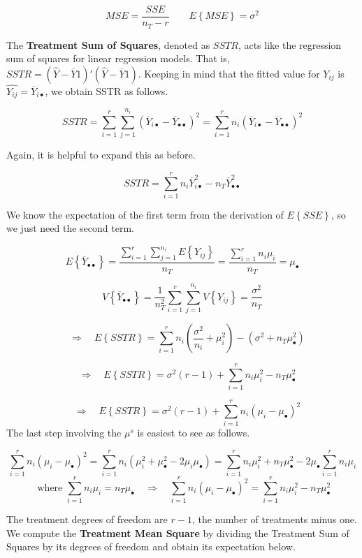\documentclass[
]{book}
\begin{document}
\[
MSE = \frac{SSE}{n_T-r}  \qquad E\left\{MSE\right\} = \sigma^2
\]

The \textbf{Treatment Sum of Squares}, denoted as \(SSTR\), acts like
the regression sum of squares for linear regression models. That is,
\(SSTR = \left(\hat{Y}-\overline{Y}1\right)'\left(\hat{Y}-\overline{Y}1\right)\).
Keeping in mind that the fitted value for \(Y_{ij}\) is
\(\hat{Y_{ij}} = \overline{Y}_{i\bullet}\), we obtain SSTR as follows.

\[
SSTR = \sum_{i=1}^r\sum_{j=1}^{n_i}
\left(\overline{Y}_{i\bullet}-
  \overline{Y}_{\bullet\bullet}\right)^2
 = \sum_{i=1}^r n_i \left(\overline{Y}_{i\bullet}-
  \overline{Y}_{\bullet\bullet}\right)^2
\]

Again, it is helpful to expand this as before.

\[
SSTR = \sum_{i=1}^r n_i \overline{Y}_{i\bullet}^2
- n_T\overline{Y}_{\bullet\bullet}^2 
\]

We know the expectation of the first term from the derivation of
\(E\left\{SSE\right\}\), so we just need the second term.

\[
E\left\{\overline{Y}_{\bullet\bullet}\right\}
=\frac{\sum_{i=1}^r\sum_{j=1}^{n_i}E\left\{Y_{ij}\right\}}{n_T}
=\frac{\sum_{i=1}^rn_i\mu_i}{n_T} = \mu_{\bullet}
\]

\[
V\left\{\overline{Y}_{\bullet\bullet}\right\}
=\frac{1}{n_T^2}\sum_{i=1}^r\sum_{j=1}^{n_i}
V\left\{Y_{ij}\right\} = \frac{\sigma^2}{n_T}
\]

\[
\quad \Rightarrow \quad
E\left\{SSTR\right\} =
\sum_{i=1}^r n_i\left(\frac{\sigma^2}{n_i} + \mu_i^2\right) -
\left(\sigma^2 + n_T \mu_{\bullet}^2\right)
\]

\[
\quad \Rightarrow \quad
E\left\{SSTR\right\} =
\sigma^2(r-1) + \sum_{i=1}^rn_i\mu_i^2 - n_T\mu_{\bullet}^2
\]

\[
\quad \Rightarrow \quad
E\left\{SSTR\right\}
= \sigma^2(r-1) + \sum_{i=1}^rn_i\left(\mu_i-\mu_{\bullet}\right)^2
\] The last step involving the \(\mu^s\) is easiest to see as follows.

\[
\sum_{i=1}^rn_i\left(\mu_i-\mu_{\bullet}\right)^2=
\sum_{i=1}^rn_i\left(\mu_i^2+\mu_{\bullet}^2-2\mu_i\mu_{\bullet}\right)=
\sum_{i=1}^rn_i \mu_i^2+n_T\mu_{\bullet}^2-2\mu_{\bullet}\sum_{i=1}^rn_i \mu_i
\] \[
\mbox{ where } \sum_{i=1}^rn_i \mu_i = n_T\mu_{\bullet} \quad \Rightarrow \quad
\sum_{i=1}^rn_i\left(\mu_i-\mu_{\bullet}\right)^2=
\sum_{i=1}^rn_i \mu_i^2-n_T\mu_{\bullet}^2
\]

The treatment degrees of freedom are \(r-1\), the number of treatments
minus one. We compute the \textbf{Treatment Mean Square} by dividing the
Treatment Sum of Squares by its degrees of freedom and obtain its
expectation below.
\end{document}
